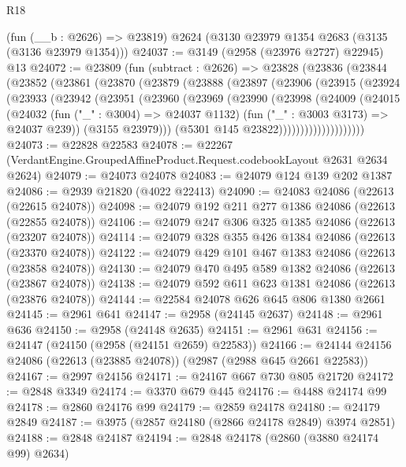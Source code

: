 \begin{lexlean}{R18}
\begin{coremodule}
    (fun (__b : @2626) => @23819)
    @2624
    (@3130 @23979 @1354 @2683 (@3135 (@3136 @23979 @1354)))
@24037 := @3149 (@2958 (@23976 @2727) @22945) @13
@24072 := @23809
    (fun (subtract : @2626) =>
    @23828
      (@23836
        (@23844
          (@23852
            (@23861
              (@23870
                (@23879
                  (@23888
                    (@23897
                      (@23906
                        (@23915
                          (@23924
                            (@23933
                              (@23942
                                (@23951
                                  (@23960
                                    (@23969
                                      (@23990
                                        (@23998
                                          (@24009
                                            (@24015
                                              (@24032
                                                (fun ("_" : @3004) => @24037 @1132)
                                                (fun ("_" : @3003 @3173) => @24037 @239))
                                              (@3155 @23979)))
                                          (@5301 @145 @23822))))))))))))))))))))
@24073 := @22828 @22583
@24078 := @22267 (VerdantEngine.GroupedAffineProduct.Request.codebookLayout @2631 @2634 @2624)
@24079 := @24073 @24078
@24083 := @24079 @124 @139 @202 @1387
@24086 := @2939 @21820 (@4022 @22413)
@24090 := @24083 @24086 (@22613 (@22615 @24078))
@24098 := @24079 @192 @211 @277 @1386 @24086 (@22613 (@22855 @24078))
@24106 := @24079 @247 @306 @325 @1385 @24086 (@22613 (@23207 @24078))
@24114 := @24079 @328 @355 @426 @1384 @24086 (@22613 (@23370 @24078))
@24122 := @24079 @429 @101 @467 @1383 @24086 (@22613 (@23858 @24078))
@24130 := @24079 @470 @495 @589 @1382 @24086 (@22613 (@23867 @24078))
@24138 := @24079 @592 @611 @623 @1381 @24086 (@22613 (@23876 @24078))
@24144 := @22584 @24078 @626 @645 @806 @1380 @2661
@24145 := @2961 @641
@24147 := @2958 (@24145 @2637)
@24148 := @2961 @636
@24150 := @2958 (@24148 @2635)
@24151 := @2961 @631
@24156 := @24147 (@24150 (@2958 (@24151 @2659) @22583))
@24166 := @24144 @24156 @24086 (@22613 (@23885 @24078)) (@2987 (@2988 @645 @2661 @22583))
@24167 := @2997 @24156
@24171 := @24167 @667 @730 @805 @21720
@24172 := @2848 @3349
@24174 := @3370 @679 @445
@24176 := @4488 @24174 @99
@24178 := @2860 @24176 @99
@24179 := @2859 @24178
@24180 := @24179 @2849
@24187 := @3975 (@2857 @24180 (@2866 @24178 @2849) @3974 @2851)
@24188 := @2848 @24187
@24194 := @2848 @24178 (@2860 (@3880 @24174 @99) @2634)

\end{coremodule}
\end{lexlean}
